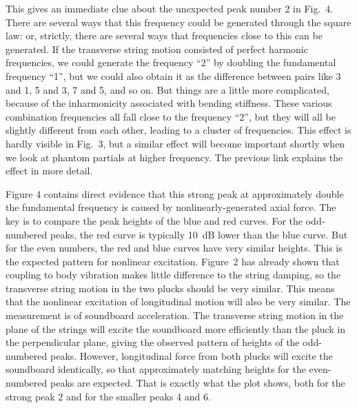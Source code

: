   This gives an immediate clue about the unexpected peak number 2 in Fig.\ 4. 
  There are several ways that this frequency could be generated through the 
  square law: or, strictly, there are several ways that frequencies close to 
  this can be generated. If the transverse string motion consisted of perfect 
  harmonic frequencies, we could generate the frequency ``2'' by doubling the 
  fundamental frequency ``1'', but we could also obtain it as the difference 
  between pairs like 3 and 1, 5 and 3, 7 and 5, and so on. But things are a 
  little more complicated, because of the inharmonicity associated with bending 
  stiffness. These various combination frequencies all fall close to the 
  frequency ``2'', but they will all be slightly different from each other, 
  leading to a cluster of frequencies. This effect is hardly visible in Fig.\ 
  3, but a similar effect will become important shortly when we look at phantom 
  partials at higher frequency. The previous link explains the effect in more 
  detail. 

  Figure 4 contains direct evidence that this strong peak at approximately 
  double the fundamental frequency is caused by nonlinearly-generated axial 
  force. The key is to compare the peak heights of the blue and red curves. For 
  the odd-numbered peaks, the red curve is typically 10~dB lower than the blue 
  curve. But for the even numbers, the red and blue curves have very similar 
  heights. This is the expected pattern for nonlinear excitation. Figure~2 has 
  already shown that coupling to body vibration makes little difference to the 
  string damping, so the transverse string motion in the two plucks should be 
  very similar. This means that the nonlinear excitation of longitudinal motion 
  will also be very similar. The measurement is of soundboard acceleration. The 
  transverse string motion in the plane of the strings will excite the 
  soundboard more efficiently than the pluck in the perpendicular plane, giving 
  the observed pattern of heights of the odd-numbered peaks. However, 
  longitudinal force from both plucks will excite the soundboard identically, 
  so that approximately matching heights for the even-numbered peaks are 
  expected. That is exactly what the plot shows, both for the strong peak 2 and 
  for the smaller peaks 4 and 6. 


